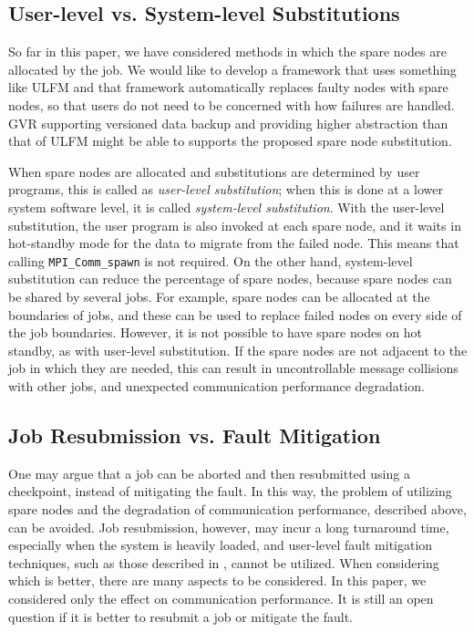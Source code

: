 \documentclass[Afour,times,sagev]{sagej}
\begin{document}
\subsection{User-level vs. System-level Substitutions}

So far in this paper, we have considered methods in which the spare
nodes are allocated by the job. We would like to develop a framework
that uses something like ULFM and that framework automatically
replaces faulty nodes with spare nodes, so that users do not need to
be concerned with how failures are handled. GVR supporting versioned 
data backup and providing higher abstraction than that of ULFM might
be able to supports the proposed spare node substitution. 

When spare nodes are
allocated and substitutions are determined by user programs, this is
called as {\it user-level substitution}; when this is done at a lower
system software level, it is called {\it system-level substitution}.
With the user-level substitution, the user program is also invoked at
each spare node, and it waits in hot-standby mode for the data to migrate
from the failed node. This means that calling {\tt MPI\_Comm\_spawn}
is not required. On the other hand, system-level substitution can
reduce the percentage of spare nodes, because spare nodes can be
shared by several jobs. For example, spare nodes can be allocated at
the boundaries of jobs, and these can be used to replace failed nodes
on every side of the job boundaries. However, it is not possible to have
spare nodes on hot standby, as with user-level substitution. If the
spare nodes are not adjacent to the job in which they are needed, this
can result in uncontrollable message collisions with other jobs, and
unexpected communication performance degradation.

\subsection{Job Resubmission vs. Fault Mitigation}

One may argue that a job can be aborted and then resubmitted using a
checkpoint, instead of mitigating the fault. In this way, the problem
of utilizing spare nodes and the degradation of communication
performance, described above, can be avoided. Job resubmission,
however, may incur a long turnaround time, especially when the system
is heavily loaded, and user-level fault mitigation techniques, such as
those described in \citep{Davies:2011:HPL:1995896.1995923}, cannot be
utilized. When considering which is better, there are many aspects to
be considered. In this paper, we considered only the effect on
communication performance. It is still an open question if it is
better to resubmit a job or mitigate the fault.
\end{document}
